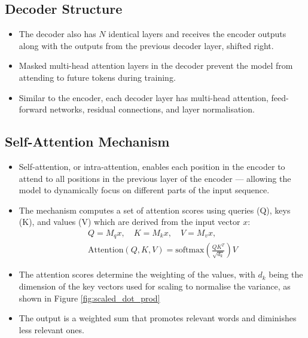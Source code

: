 \subsection{Decoder Structure}
\begin{itemize}
    \item The decoder also has \(N\) identical layers and receives the encoder outputs along with the outputs from the previous decoder layer, shifted right.
    \item Masked multi-head attention layers in the decoder prevent the model from attending to future tokens during training.
    \item Similar to the encoder, each decoder layer has multi-head attention, feed-forward networks, residual connections, and layer normalisation.
\end{itemize}

\subsection{Self-Attention Mechanism}
\begin{itemize}
    \item Self-attention, or intra-attention, enables each position in the encoder to attend to all positions in the previous layer of the encoder — allowing the model to dynamically focus on different parts of the input sequence.
    \item The mechanism computes a set of attention scores using queries (Q), keys (K), and values (V) which are derived from the input vector \(x\):
    \begin{align*}
        Q = M_q x, \quad K = M_k x, \quad V = M_v x, \\
        \text{Attention}(Q, K, V) = \text{softmax}\left(\frac{QK^T}{\sqrt{d_k}}\right)V
    \end{align*}
    \item The attention scores determine the weighting of the values, with \(d_k\) being the dimension of the key vectors used for scaling to normalise the variance, as shown in Figure \ref{fig:scaled_dot_prod} 
    \item The output is a weighted sum that promotes relevant words and diminishes less relevant ones.
\end{itemize}

